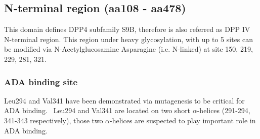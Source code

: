 \subsection{N-terminal region (aa108 - aa478)}

This domain defines DPP4 subfamily S9B, therefore is also referred as DPP IV N-terminal region. This region under heavy glycosylation, with up to 5 sites can be modified via N-Acetylglucosamine Asparagine (i.e. N-linked) at site 150, 219, 229, 281, 321.\cite{Rasmussen2003,Thoma2003,Meng2010,Chen2009}   

\subsubsection{ADA binding site}
Leu294 and Val341 have been demonstrated via mutagenesis to be critical for ADA binding.~\cite{Abbott_1999} Leu294 and Val341 are located on two short $\alpha$-helices (291-294, 341-343 respectively), those two $\alpha$-helices are suspected to play important role in ADA binding. 